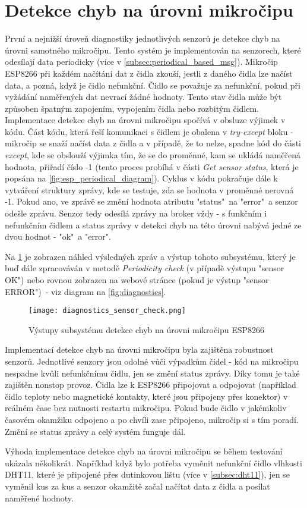 \section{Detekce chyb na úrovni mikročipu} \label{sec:error_detection_esp}
První a nejnižší úroveň diagnostiky jednotlivých senzorů je detekce chyb na úrovni samotného mikročipu. Tento systém je implementován na senzorech, které odesílají data periodicky (více v \cref{subsec:periodical_based_msg}). Mikročip ESP8266 při každém načítání dat z čidla zkouší, jestli z daného čidla lze načíst data, a pozná, když je čidlo nefunkční. Čidlo se považuje za nefunkční, pokud při vyžádání naměřených dat nevrací žádné hodnoty. Tento stav čidla může být způsoben špatným zapojením, vypojením čidla nebo rozbitým čidlem. Implementace detekce chyb na úrovni mikročipu spočívá v obsluze výjimek v kódu. Část kódu, která řeší komunikaci s čidlem je obalena v \textit{try-except} bloku - mikročip se snaží načíst data z čidla a v případě, že to nelze, spadne kód do části \textit{except}, kde se obslouží výjimka tím, že se do proměnné, kam se ukládá naměřená hodnota, přiřadí číslo -1 (tento proces probíhá v části \textit{Get sensor status}, která je popsána na \cref{fig:esp_periodical_diagram}). Cyklus v kódu pokračuje dále k vytváření struktury zprávy, kde se testuje, zda se hodnota v proměnné nerovná -1. Pokud ano, ve zprávě se změní hodnota atributu "status"\ na "error"\ a senzor odešle zprávu. Senzor tedy odesílá zprávy na broker vždy - s funkčním i nefunkčním čidlem a status zprávy v detekci chyb na této úrovni nabývá jedné ze dvou hodnot - "ok"\ a "error".\par
Na \cref{fig:diagnostics_sensor_check} je zobrazen náhled výsledných zpráv a výstup tohoto subsystému, který je buď dále zpracováván v metodě \textit{Periodicity check} (v případě výstupu "sensor OK") nebo rovnou zobrazen na webové stránce (pokud je výstup "sensor ERROR")\ - viz diagram na \cref{fig:diagnostics}. 

\begin{figure}[H]
  \centering
  \texttt{[image: diagnostics\_sensor\_check.png]}
  \caption{Výstupy subsystému detekce chyb na úrovni mikročipu ESP8266}
  \label{fig:diagnostics_sensor_check}
\end{figure} 

Implementací detekce chyb na úrovni mikročipu byla zajištěna robustnost senzorů. Jednotlivé senzory jsou odolné vůči výpadkům čidel - kód na mikročipu nespadne kvůli nefunkčnímu čidlu, jen se změní status zprávy. Díky tomu je také zajištěn nonstop provoz. Čidla lze k ESP8266 připojovat a odpojovat (například čidlo teploty nebo magnetické kontakty, které jsou připojeny přes konektor) v reálném čase bez nutnosti restartu mikročipu. Pokud bude čidlo v jakémkoliv časovém okamžiku odpojeno a po chvíli zase připojeno, mikročip si s tím poradí. Změní se status zprávy a celý systém funguje dál. \par
Výhoda implementace detekce chyb na úrovni mikročipu se během testování ukázala několikrát. Například když bylo potřeba vyměnit nefunkční čidlo vlhkosti DHT11, které je připojené přes dutinkovou lištu (více v \cref{subsec:dht11}), jen se vyměnil kus za kus a senzor okamžitě začal načítat data z čidla a posílat naměřené hodnoty.


